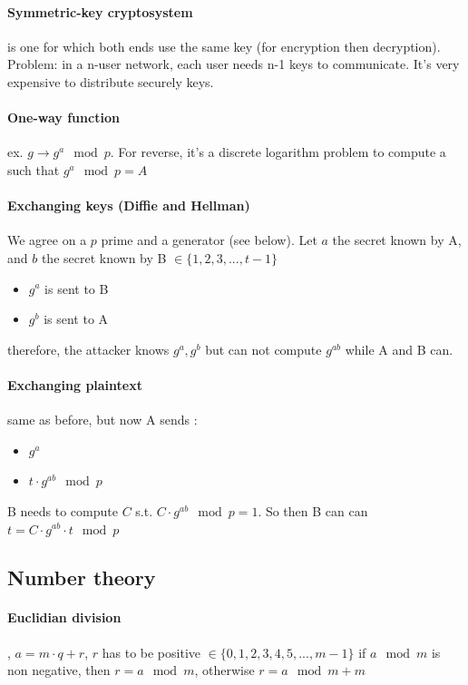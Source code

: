 \documentclass{article}
\begin{document}
\paragraph{Symmetric-key cryptosystem} is one for which both ends use the same key (for encryption then decryption). Problem: in a n-user network, each user needs n-1 keys to communicate. It's very expensive to distribute securely keys.

\paragraph{One-way function} ex. $ g \to g^a \mod{p} $. For reverse, it's a discrete logarithm problem to compute a such that $ g^a \mod p = A $

\paragraph{Exchanging keys (Diffie and Hellman)} We agree on a $ p $ prime and a generator (see below).
Let $ a $ the secret known by A, and $ b $ the secret known by  B $ \in \{ 1, 2, 3, ..., t-1 \} $
\begin{itemize}
    \item $ g^a $ is sent to B
    \item $ g^b $ is sent to A
\end{itemize}
therefore, the attacker knows $ g^a, g^b $ but can not compute $ g^{ab} $ while A and B can.

\paragraph{Exchanging plaintext} same as before, but now A sends :
\begin{itemize}
    \item $ g^a $
    \item $ t \cdot {g^{ab} \mod p} $
\end{itemize}
B needs to compute $ C $ s.t. $ C \cdot g^{ab} \mod p = 1 $.
So then B can can $ t = C \cdot g^{ab} \cdot t \mod p $

\newpage

\subsection{Number theory}

\paragraph{Euclidian division}, $ a = m \cdot q + r $, $ r $ has to be positive $ \in \{0,1,2,3,4,5,...,m-1\}$
if $ a \mod m $ is non negative, then $ r = a \mod m $, otherwise $ r = a \mod m + m $
\end{document}
